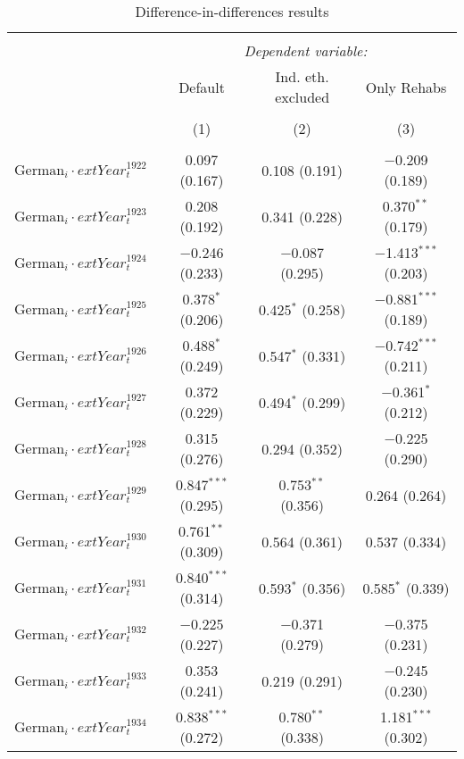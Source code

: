 
\begin{table}[!h] \centering 
  \caption{Difference-in-differences results} 
  \label{dif_table} 
\small 
\begin{tabular}{@{\extracolsep{5pt}}lccc} 
\\[-1.8ex]\hline 
\hline \\[-1.8ex] 
 & \multicolumn{3}{c}{\textit{Dependent variable:}} \\ 
\cline{2-4} 
 & Default & Ind. eth. excluded & Only Rehabs \\ 
\\[-1.8ex] & (1) & (2) & (3)\\ 
\hline \\[-1.8ex] 
 $\text{German}_{i} \cdot 	ext{Year}_{t}^1922$ & 0.097 (0.167) & 0.108 (0.191) & $-$0.209 (0.189) \\ 
  $\text{German}_{i} \cdot 	ext{Year}_{t}^1923$ & 0.208 (0.192) & 0.341 (0.228) & 0.370$^{**}$ (0.179) \\ 
  $\text{German}_{i} \cdot 	ext{Year}_{t}^1924$ & $-$0.246 (0.233) & $-$0.087 (0.295) & $-$1.413$^{***}$ (0.203) \\ 
  $\text{German}_{i} \cdot 	ext{Year}_{t}^1925$ & 0.378$^{*}$ (0.206) & 0.425$^{*}$ (0.258) & $-$0.881$^{***}$ (0.189) \\ 
  $\text{German}_{i} \cdot 	ext{Year}_{t}^1926$ & 0.488$^{*}$ (0.249) & 0.547$^{*}$ (0.331) & $-$0.742$^{***}$ (0.211) \\ 
  $\text{German}_{i} \cdot 	ext{Year}_{t}^1927$ & 0.372 (0.229) & 0.494$^{*}$ (0.299) & $-$0.361$^{*}$ (0.212) \\ 
  $\text{German}_{i} \cdot 	ext{Year}_{t}^1928$ & 0.315 (0.276) & 0.294 (0.352) & $-$0.225 (0.290) \\ 
  $\text{German}_{i} \cdot 	ext{Year}_{t}^1929$ & 0.847$^{***}$ (0.295) & 0.753$^{**}$ (0.356) & 0.264 (0.264) \\ 
  $\text{German}_{i} \cdot 	ext{Year}_{t}^1930$ & 0.761$^{**}$ (0.309) & 0.564 (0.361) & 0.537 (0.334) \\ 
  $\text{German}_{i} \cdot 	ext{Year}_{t}^1931$ & 0.840$^{***}$ (0.314) & 0.593$^{*}$ (0.356) & 0.585$^{*}$ (0.339) \\ 
  $\text{German}_{i} \cdot 	ext{Year}_{t}^1932$ & $-$0.225 (0.227) & $-$0.371 (0.279) & $-$0.375 (0.231) \\ 
  $\text{German}_{i} \cdot 	ext{Year}_{t}^1933$ & 0.353 (0.241) & 0.219 (0.291) & $-$0.245 (0.230) \\ 
  $\text{German}_{i} \cdot 	ext{Year}_{t}^1934$ & 0.838$^{***}$ (0.272) & 0.780$^{**}$ (0.338) & 1.181$^{***}$ (0.302) \\ 

\end{tabular}
\end{table}
